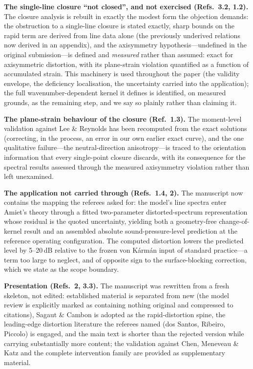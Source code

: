 \documentclass[11pt,a4paper]{article}
\begin{document}
\vspace{5mm}

\textbf{The single-line closure ``not closed'', and not exercised
(Refs.\ 3.2, 1.2).} The closure analysis is rebuilt in exactly the
modest form the objection demands: the obstruction to a single-line
closure is stated exactly, sharp bounds on the rapid term are derived
from line data alone (the previously underived relations now derived in
an appendix), and the axisymmetry hypothesis---undefined in the
original submission---is defined and \emph{measured} rather than
assumed: exact for axisymmetric distortion, with its plane-strain
violation quantified as a function of accumulated strain. This
machinery is used throughout the paper (the validity envelope, the
deficiency localisation, the uncertainty carried into the application);
the full wavenumber-dependent kernel it defines is identified, on
measured grounds, as the remaining step, and we say so plainly rather
than claiming it.

\vspace{5mm}

\textbf{The plane-strain behaviour of the closure (Ref.\ 1.3).} The
moment-level validation against Lee \& Reynolds has been recomputed
from the exact solutions (correcting, in the process, an error in our
own earlier exact curve), and the one qualitative failure---the
neutral-direction anisotropy---is traced to the orientation information
that every single-point closure discards, with its consequence for the
spectral results assessed through the measured axisymmetry violation
rather than left unexamined.

\vspace{5mm}

\textbf{The application not carried through (Refs.\ 1.4, 2).} The
manuscript now contains the mapping the referees asked for: the model's
line spectra enter Amiet's theory through a fitted two-parameter
distorted-spectrum representation whose residual is the quoted
uncertainty, yielding both a geometry-free change-of-kernel result and
an assembled absolute sound-pressure-level prediction at the reference
operating configuration. The computed distortion lowers the predicted
level by 5--20\,dB relative to the frozen von K\'arm\'an input of
standard practice---a term too large to neglect, and of opposite sign
to the surface-blocking correction, which we state as the scope
boundary.

\vspace{5mm}

\textbf{Presentation (Refs.\ 2, 3.3).} The manuscript was rewritten
from a fresh skeleton, not edited: established material is separated
from new (the model review is explicitly marked as containing nothing
original and compressed to citations), Sagaut \& Cambon is adopted as
the rapid-distortion spine, the leading-edge distortion literature the
referees named (dos Santos, Ribeiro, Piccolo) is engaged, and the main
text is shorter than the rejected version while carrying substantially
more content; the validation against Chen, Meneveau \& Katz and the
complete intervention family are provided as supplementary material.
\end{document}
